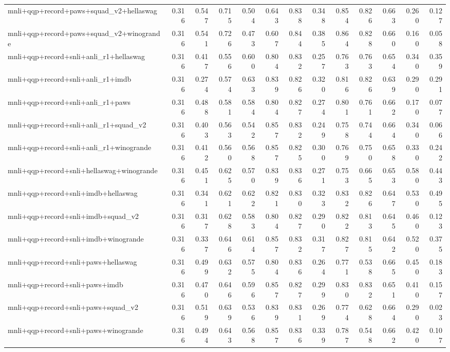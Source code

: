 \begin{table}[t]
\begin{tabular}{lrrrrrrrrrrrr}
    mnli+qqp+record+paws+squad\_v2+hellaswag & 0.316 & 0.547 & 0.715 & 0.504 & 0.643 & 0.838 & 0.348 & 0.854 & 0.826 & 0.663 & 0.260 & 0.127 \\
    mnli+qqp+record+paws+squad\_v2+winogrande & 0.316 & 0.541 & 0.726 & 0.473 & 0.607 & 0.844 & 0.385 & 0.864 & 0.828 & 0.660 & 0.160 & 0.058 \\
    mnli+qqp+record+snli+anli\_r1+hellaswag & 0.316 & 0.417 & 0.556 & 0.600 & 0.804 & 0.832 & 0.257 & 0.763 & 0.763 & 0.654 & 0.340 & 0.359 \\
    mnli+qqp+record+snli+anli\_r1+imdb & 0.316 & 0.274 & 0.574 & 0.633 & 0.839 & 0.826 & 0.320 & 0.816 & 0.826 & 0.639 & 0.290 & 0.291 \\
    mnli+qqp+record+snli+anli\_r1+paws & 0.316 & 0.488 & 0.581 & 0.584 & 0.804 & 0.827 & 0.274 & 0.801 & 0.761 & 0.662 & 0.170 & 0.077 \\
    mnli+qqp+record+snli+anli\_r1+squad\_v2 & 0.316 & 0.403 & 0.563 & 0.542 & 0.857 & 0.832 & 0.249 & 0.758 & 0.744 & 0.664 & 0.340 & 0.066 \\
    mnli+qqp+record+snli+anli\_r1+winogrande & 0.316 & 0.412 & 0.560 & 0.568 & 0.857 & 0.825 & 0.300 & 0.769 & 0.750 & 0.658 & 0.330 & 0.242 \\
    mnli+qqp+record+snli+hellaswag+winogrande & 0.316 & 0.451 & 0.625 & 0.570 & 0.839 & 0.836 & 0.271 & 0.753 & 0.665 & 0.653 & 0.580 & 0.443 \\
    mnli+qqp+record+snli+imdb+hellaswag & 0.316 & 0.341 & 0.621 & 0.622 & 0.821 & 0.830 & 0.323 & 0.832 & 0.826 & 0.647 & 0.530 & 0.495 \\
    mnli+qqp+record+snli+imdb+squad\_v2 & 0.316 & 0.317 & 0.628 & 0.583 & 0.804 & 0.827 & 0.290 & 0.822 & 0.813 & 0.645 & 0.460 & 0.123 \\
    mnli+qqp+record+snli+imdb+winogrande & 0.316 & 0.337 & 0.646 & 0.614 & 0.857 & 0.832 & 0.317 & 0.827 & 0.815 & 0.642 & 0.520 & 0.375 \\
    mnli+qqp+record+snli+paws+hellaswag & 0.316 & 0.499 & 0.632 & 0.575 & 0.804 & 0.836 & 0.264 & 0.771 & 0.538 & 0.665 & 0.450 & 0.183 \\
    mnli+qqp+record+snli+paws+imdb & 0.316 & 0.470 & 0.646 & 0.596 & 0.857 & 0.827 & 0.299 & 0.830 & 0.832 & 0.651 & 0.410 & 0.157 \\
    mnli+qqp+record+snli+paws+squad\_v2 & 0.316 & 0.519 & 0.639 & 0.536 & 0.839 & 0.831 & 0.269 & 0.774 & 0.628 & 0.664 & 0.290 & 0.023 \\
    mnli+qqp+record+snli+paws+winogrande & 0.316 & 0.494 & 0.643 & 0.568 & 0.857 & 0.836 & 0.339 & 0.787 & 0.548 & 0.662 & 0.420 & 0.107 \\

\end{tabular}
\end{table}
